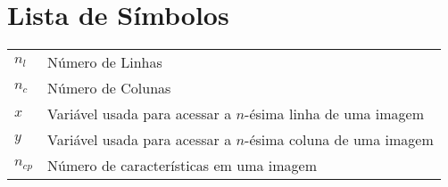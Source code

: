 \documentclass[11pt,twoside,a4paper]{book}
\renewcommand{\chaptermark}[1]{\markboth{\MakeUppercase{#1}}{}}
\begin{document}
\chapter{Lista de Símbolos}
\begin{tabular}{ll}
        $n_l$   & Número de Linhas\\
        $n_c$   & Número de Colunas\\
        $x$     & Variável usada para acessar a $n$-ésima linha de uma imagem \\
        $y$     & Variável usada para acessar a $n$-ésima coluna de uma imagem \\
        $n_{cp}$  & Número de características em uma imagem \\
\end{tabular}

\listoffigures
\listoftables

\mainmatter

\fancyhead[RE,LO]{\thesection}

\singlespacing              %


\renewcommand{\chaptermark}[1]{\markboth{\MakeUppercase{\appendixname\ \thechapter}} {\MakeUppercase{#1}} }
\fancyhead[RE,LO]{}
\appendix

\backmatter \singlespacing   %

\printindex   %
\end{document}
